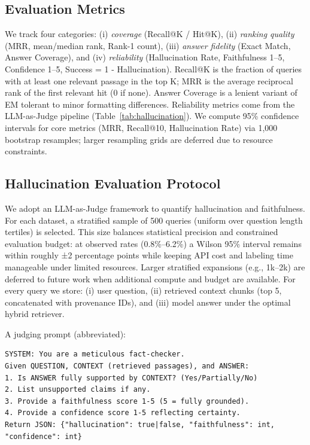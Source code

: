 \documentclass[11pt]{article}
\begin{document}
\subsection{Evaluation Metrics}\label{subsec:eval-metrics}
We track four categories: (i) \textit{coverage} (Recall@K / Hit@K), (ii) \textit{ranking quality} (MRR, mean/median rank, Rank-1 count), (iii) \textit{answer fidelity} (Exact Match, Answer Coverage), and (iv) \textit{reliability} (Hallucination Rate, Faithfulness 1--5, Confidence 1--5, Success = 1 - Hallucination).
Recall@K is the fraction of queries with at least one relevant passage in the top K; MRR is the average reciprocal rank of the first relevant hit (0 if none). Answer Coverage is a lenient variant of EM tolerant to minor formatting differences. Reliability metrics come from the LLM-as-Judge pipeline (Table~\ref{tab:hallucination}). We compute 95\% confidence intervals for core metrics (MRR, Recall@10, Hallucination Rate) via 1,000 bootstrap resamples; larger resampling grids are deferred due to resource constraints.

\subsection{Hallucination Evaluation Protocol}
We adopt an LLM-as-Judge framework to quantify hallucination and faithfulness. For each dataset, a stratified sample of 500 queries (uniform over question length tertiles) is selected. This size balances statistical precision and constrained evaluation budget: at observed rates (0.8\%--6.2\%) a Wilson 95\% interval remains within roughly ±2 percentage points while keeping API cost and labeling time manageable under limited resources. Larger stratified expansions (e.g., 1k--2k) are deferred to future work when additional compute and budget are available. For every query we store: (i) user question, (ii) retrieved context chunks (top 5, concatenated with provenance IDs), and (iii) model answer under the optimal hybrid retriever.

A judging prompt (abbreviated):
\begin{lstlisting}[basicstyle=\ttfamily\scriptsize]
SYSTEM: You are a meticulous fact-checker.
Given QUESTION, CONTEXT (retrieved passages), and ANSWER:
1. Is ANSWER fully supported by CONTEXT? (Yes/Partially/No)
2. List unsupported claims if any.
3. Provide a faithfulness score 1-5 (5 = fully grounded).
4. Provide a confidence score 1-5 reflecting certainty.
Return JSON: {"hallucination": true|false, "faithfulness": int, "confidence": int}
\end{lstlisting}
\end{document}
